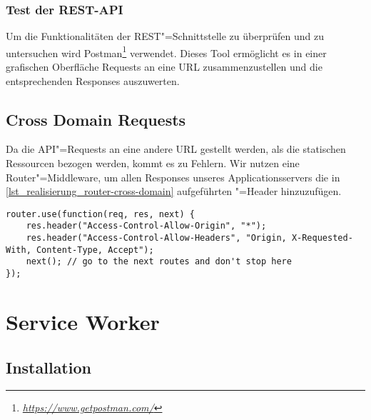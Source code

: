 \subsubsection{Test der REST-API}

Um die Funktionalitäten der REST"=Schnittstelle zu überprüfen und zu untersuchen wird Postman\footnote{\textit{\url{https://www.getpostman.com/}}} verwendet. Dieses Tool ermöglicht es in einer grafischen Oberfläche Requests an eine URL zusammenzustellen und die entsprechenden Responses auszuwerten.

\subsection{Cross Domain Requests}

Da die API"=Requests an eine andere URL gestellt werden, als die statischen Ressourcen bezogen werden, kommt es zu  Fehlern. Wir nutzen eine Router"=Middleware, um allen Responses unseres Applicationsservers die in \ref{lst_realisierung_router-cross-domain} aufgeführten "=Header hinzuzufügen.

\begin{lstlisting}[caption={Router-Middleware um jedem Response die \code{Access-Control}-Header hinzuzufügen},label={lst_realisierung_router-cross-domain}, frame=single]
router.use(function(req, res, next) {
    res.header("Access-Control-Allow-Origin", "*");
    res.header("Access-Control-Allow-Headers", "Origin, X-Requested-With, Content-Type, Accept");
    next(); // go to the next routes and don't stop here
});
\end{lstlisting}

\newpage
\section{Service Worker}
\label{sec_realisierung_serviceworker}

\subsection{Installation}

